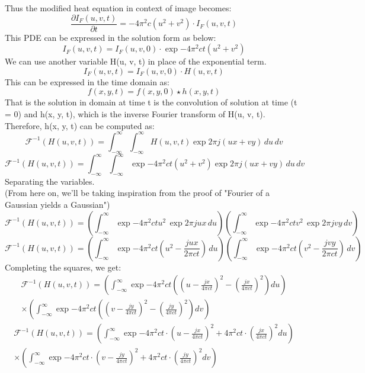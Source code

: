 \documentclass{article}
\begin{document}
\begin{enumerate}
Thus the modified heat equation in context of image becomes:
\[
    \frac{\partial I_F(u, v, t)}{\partial t} = -4\pi^2c(u^2 + v^2)\cdot I_F(u, v, t)
\]
This PDE can be expressed in the solution form as below:
\[
    I_F(u, v, t) = I_F(u, v, 0)\cdot\exp{-4\pi^2ct(u^2+v^2)}
\]
We can use another variable H(u, v, t) in place of the exponential term.
\[
    I_F(u, v, t) = I_F(u, v, 0)\cdot H(u, v, t)
\]
This can be expressed in the time domain as:
\[
    f(x, y, t) = f(x, y, 0) \star h(x, y, t)
\]
That is the solution in domain at time t is the convolution of solution at time (t = 0) and h(x, y, t), which is the inverse Fourier transform of H(u, v, t). Therefore, h(x, y, t) can be computed as:
\[
    \mathcal{F}^{-1}(H(u, v, t)) = \int_{-\infty}^{\infty} \int_{-\infty}^{\infty} H(u, v, t) \exp{2\pi j (ux + vy)} \, du \, dv
\]
\[
    \mathcal{F}^{-1}(H(u, v, t)) = \int_{-\infty}^{\infty} \int_{-\infty}^{\infty} \exp{-4\pi^2ct(u^2+v^2)} \exp{2\pi j (ux + vy)} \, du \, dv
\]
Separating the variables. \\
(From here on, we'll be taking inspiration from the proof of "Fourier of a Gaussian yields a Gaussian")
\[
    \mathcal{F}^{-1}(H(u, v, t)) = \left(\int_{-\infty}^{\infty} \exp{-4\pi^2ctu^2}\, \exp{2\pi jux}\,  du \right) \left(\int_{-\infty}^{\infty} \exp{-4\pi^2ctv^2}\, \exp{2\pi jvy}\,  dv \right)
\]
\[
    \mathcal{F}^{-1}(H(u, v, t)) = \left(\int_{-\infty}^{\infty} \exp{-4\pi^2ct \left(u^2 - \frac{jux}{2\pi c t}\right)}\,  du \right) \left(\int_{-\infty}^{\infty} \exp{-4\pi^2ct \left(v^2 - \frac{jvy}{2\pi c t}\right)}\,  dv \right)
\]
Completing the squares, we get:
\begin{multline*}
    \mathcal{F}^{-1}(H(u, v, t)) = \left( \int_{-\infty}^{\infty} 
    \exp{ -4\pi^2ct \left( \left(u - \frac{jx}{4\pi c t}\right)^2 
    - \left( \frac{jx}{4\pi ct} \right)^2 \right) } du \right) \\
    \times \left( \int_{-\infty}^{\infty} 
    \exp { -4\pi^2ct \left( \left(v - \frac{jy}{4\pi c t}\right)^2 
    - \left( \frac{jy}{4\pi ct} \right)^2 \right) } dv \right)
\end{multline*}
\begin{multline*}
    \mathcal{F}^{-1}(H(u, v, t)) = \left( \int_{-\infty}^{\infty} 
    \exp { -4\pi^2ct \cdot \left(u - \frac{jx}{4\pi c t}\right)^2 
    + 4\pi^2ct \cdot \left( \frac{jx}{4\pi ct} \right)^2 } du \right) \\
    \times \left( \int_{-\infty}^{\infty} 
    \exp { -4\pi^2ct \cdot \left(v - \frac{jy}{4\pi c t}\right)^2 
    + 4\pi^2ct \cdot \left( \frac{jy}{4\pi ct} \right)^2 } dv \right)

\end{multline*}
\end{enumerate}
\end{document}
